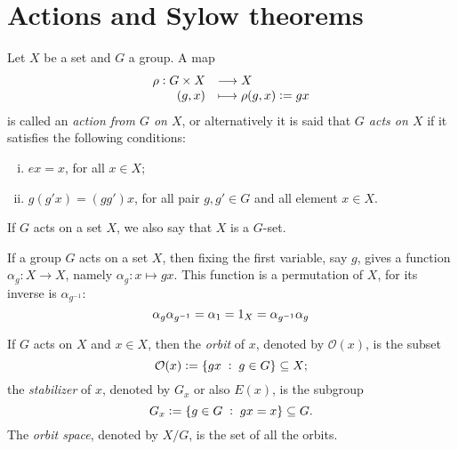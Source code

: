 \documentclass[../main.tex]{subfiles}
\begin{document}
\section{Actions and Sylow theorems}

\begin{defi}
 Let $X$ be a set and $G$ a group. A map
\begin{equation}
    \notag
    \begin{array}{rl}
        \rho:G\times X & \longrightarrow X \\
        (g,x) & \longmapsto \rho(g,x):=gx
    \end{array}
\end{equation}
is called an \textit{action from $G$ on $X$}, or alternatively it is said that \textit{$G$ acts on $X$} if it satisfies the following conditions:
\begin{enumerate}[(i)]
    \item $ex = x$, for all $x\in X$;
    \item $g(g'x) = (gg')x$, for all pair $g,g'\in G$ and all element $x\in X$.
\end{enumerate}
\end{defi}

If $G$ acts on a set $X$, we also say that $X$ is a $G$-set.

If a group $G$ acts on a set $X$, then fixing the first variable, say $g$, gives a function $\alpha_g:X\rightarrow X$, namely $\alpha_g:x\mapsto gx$. This function is a permutation of $X$, for its inverse is $\alpha_{g^{-1}}$:
\begin{equation}
    \notag
    \alpha_g\alpha_{g^{-1}} = \alpha_1 = 1_X = \alpha_{g^{-1}}\alpha_g
\end{equation}

\begin{defi}
 If $G$ acts on $X$ and $x\in X$, then the \textit{orbit} of $x$, denoted by $\mathcal{O}(x)$, is the subset
\begin{equation}
    \notag
    \mathcal{O}(x) := \{gx\;:\;g\in G\}\subseteq X;
\end{equation}
the \textit{stabilizer} of $x$, denoted by $G_x$ or also $E(x)$, is the subgroup
\begin{equation}
    \notag
    G_x:=\{g\in G\;:\;gx = x\}\subseteq G.
\end{equation}
The \textit{orbit space}, denoted by $X/G$, is the set of all the orbits.
\end{defi}
\end{document}
